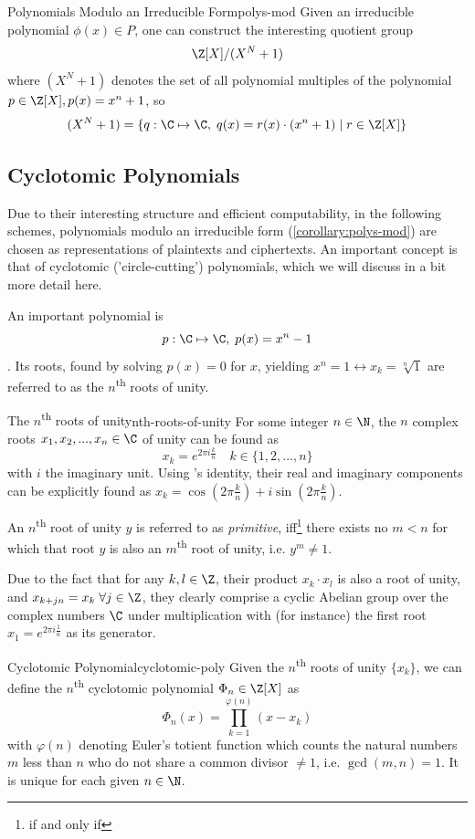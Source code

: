 \begin{corollary}{Polynomials Modulo an Irreducible Form}{polys-mod}
  Given an irreducible polynomial $\phi(x) \in P$, one can construct the interesting quotient group
  $$\Z[X] / (X^N + 1)$$
  where $(X^N + 1)$ denotes the set of all polynomial multiples of the polynomial $p \in \Z[X], p(x) = x^n + 1$, so
  $$(X^N+1) = \{q: \C \mapsto \C,\; q(x) = r(x) \cdot (x^n+1) \;|\; r \in \Z[X]\}$$
\end{corollary}

\subsection{Cyclotomic Polynomials}
Due to their interesting structure and efficient computability, in the following schemes,
polynomials modulo an irreducible form (\autoref{corollary:polys-mod}) are
chosen as representations of plaintexts and ciphertexts.
An important concept is that of cyclotomic ('circle-cutting') polynomials, which we will discuss
in a bit more detail here.

An important polynomial is $$p: \C \mapsto \C, \; p(x) = x^n - 1$$.
Its roots, found by solving $p(x) = 0$ for $x$, yielding $x^n = 1 \leftrightarrow x_k = \sqrt[n]{1}$
are referred to as the $n$\textsuperscript{th} roots of unity.

\begin{lemma}{The $n$\textsuperscript{th} roots of unity}{nth-roots-of-unity}
  For some integer $n \in \N$, the $n$ complex roots $x_1, x_2, ..., x_n \in \C$ of unity
  can be found as $$x_k = e^{2\pi i \frac{k}{n}} \quad k \in \{1, 2, ..., n\}$$
  with $i$ the imaginary unit.
  Using 's identity, their real and imaginary components can be explicitly found as
  $x_k = \cos(2\pi \frac{k}{n}) + i \sin(2\pi \frac{k}{n})$.

  An $n$\textsuperscript{th} root of unity $y$ is referred to as \textit{primitive}, iff\footnote{if and only if}
  there exists no $m < n$ for which that root $y$ is also an $m$\textsuperscript{th} root of unity, i.e. $y^m \neq 1$.
\end{lemma}
Due to the fact that for any $k, l \in \Z$, their product $x_k \cdot x_l$ is also a root of unity, and
$x_{k+jn} = x_k \; \forall j \in \Z$, they clearly comprise a cyclic Abelian group over the complex numbers
$\C$ under multiplication with (for instance) the first root $x_1 = e^{2\pi i \frac{1}{n}}$ as its generator.

\begin{definition}{Cyclotomic Polynomial}{cyclotomic-poly}
  Given the $n$\textsuperscript{th} roots of unity $\{x_k\}$, we can define the $n$\textsuperscript{th}
  cyclotomic polynomial $\Phi_n \in \Z[X]$ as
  $$\Phi_n(x) = \prod_{k=1}^{\varphi(n)} (x - x_k)$$
  with $\varphi(n)$ denoting Euler's totient function which counts the
  natural numbers $m$ less than $n$ who do not share a common divisor $\neq 1$, i.e. $\gcd(m, n) = 1$.
  It is unique for each given $n \in \N$.
\end{definition}

